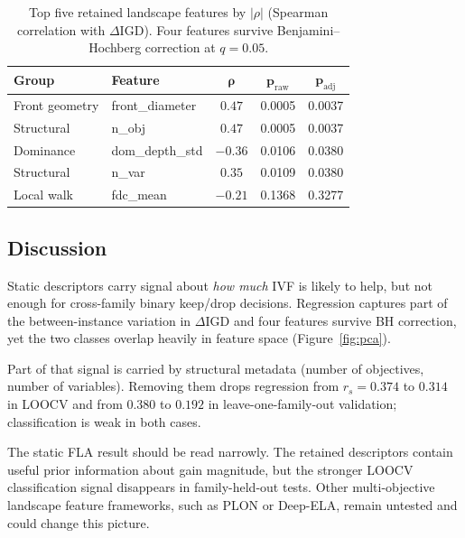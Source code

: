 \documentclass[runningheads]{llncs}
\begin{document}
\begin{table}[t]
	\centering
	\caption{Top five retained landscape features by $|\rho|$ (Spearman
		correlation with $\Delta\mathrm{IGD}$). Four features survive
		Benjamini--Hochberg correction at $q = 0.05$.}
	\label{tab:fla_top5}
	\begin{tabular}{llccc}
		\toprule
		\textbf{Group}                  & \textbf{Feature}                & $\boldsymbol{\rho}$ &
		$\boldsymbol{p_{\mathrm{raw}}}$ & $\boldsymbol{p_{\mathrm{adj}}}$                                         \\
		\midrule
		Front geometry                  & front\_diameter                 & $0.47$              & 0.0005 & 0.0037 \\
		Structural                      & n\_obj                          & $0.47$              & 0.0005 & 0.0037 \\
		Dominance                       & dom\_depth\_std                 & $-0.36$             & 0.0106 & 0.0380 \\
		Structural                      & n\_var                          & $0.35$              & 0.0109 & 0.0380 \\
		Local walk                      & fdc\_mean                       & $-0.21$             & 0.1368 & 0.3277 \\
		\bottomrule
	\end{tabular}
\end{table}

\subsection{Discussion}
\label{sec:fla_discussion}

Static descriptors carry signal about \emph{how much} IVF is likely to help,
but not enough for cross-family binary keep/drop decisions. Regression
captures part of the between-instance variation in $\Delta\mathrm{IGD}$ and
four features survive BH correction, yet the two classes overlap heavily in
feature space (Figure~\ref{fig:pca}).

Part of that signal is carried by structural metadata (number of objectives,
number of variables). Removing them drops regression from $r_s\!=\!0.374$ to
$0.314$ in LOOCV and from $0.380$ to $0.192$ in leave-one-family-out
validation; classification is weak in both cases.

The static FLA result should be read narrowly. The retained descriptors
contain useful prior information about gain magnitude, but the stronger LOOCV
classification signal disappears in family-held-out tests.
Other multi-objective landscape feature frameworks, such as PLON or Deep-ELA,
remain untested and could change this picture.
\end{document}
